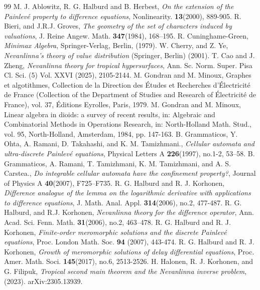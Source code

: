 \documentclass{article}
\begin{document}
\begin{thebibliography}{99}
 M. J. Ablowitz, R. G. Halburd and B. Herbest, \textit{On the extension of the Painlev\'{e} property to difference equations}, Nonlinearity. \textbf{13}(2000), 889-905.
 R. Bieri, and J.R.J. Groves, \textit{The geometry of the set of characters induced by valuations}, J. Reine
Angew. Math. \textbf{347}(1984), 168–195.
 R. Cuninghame-Green, \textit{Minimax Algebra}, Springer-Verlag, Berlin, (1979).
 W. Cherry, and Z. Ye, \textit{Nevanlinna's theory of value distribution} (Springer, Berlin) (2001).
 T. Cao and J. Zheng, \textit{Nevanlinna theory for tropical hypersurfaces}, Ann. Sc. Norm. Super. Pisa Cl. Sci. (5) Vol. XXVI (2025), 2105-2144.
 M. Gondran and M. Minoux, Graphes et algotithmes, Collection de la Direction des \'Etudes et Recherches d'\'Electricit\'e de France (Collection of the Department of Studies and Research of \'Electricit\'e de France), vol. 37, \'Editions Eyrolles, Paris, 1979.
 M. Gondran and M. Minoux, Linear algebra in dioids: a survey of recent results, in: Algebraic and Combinatorial Methods in Operations Research, in: North-Holland Math. Stud., vol. 95, North-Holland, Amsterdam, 1984, pp. 147-163.
 B. Grammaticos, Y. Ohta, A. Ramani, D. Takahashi, and K. M. Tamizhmani., \textit{Cellular automata and ultra-discrete Painlev\'e equations}, Physical Letters A \textbf{226}(1997), no.1-2, 53–58.
 B. Grammaticos, A. Ramani, T. Tamizhmani, K. M. Tamizhmani, and A. S. Carstea., \textit{Do
integrable cellular automata have the confinement property?}, Journal of Physics A \textbf{40}(2007), F725–F735.
 R. G. Halburd and R. J. Korhonen, \textit{Difference analogue of the lemma on the logarithmic derivative with applications to difference equations}, J. Math. Anal. Appl. \textbf{314}(2006), no.2, 477-487.
 R. G. Halburd, and R.J. Korhonen, \textit{Nevanlinna theory for the difference operator}, Ann. Acad. Sci. Fenn. Math. \textbf{31}(2006), no.2, 463–478.
 R. G. Halburd and R. J. Korhonen, \textit{Finite-order meromorphic solutions and the discrete Painlev\'{e} equations}, Proc. London Math. Soc. \textbf{94} (2007), 443-474.
 R. G. Halburd and R. J. Korhonen, \textit{Growth of meromorphic solutions of delay differential equations}, Proc. Amer. Math. Soci. \textbf{145}(2017), no.6, 2513-2526.
 H. Halonen, R. J. Korhonen, and G. Filipuk, \textit{Tropical second main theorem and the Nevanlinna inverse problem}, (2023). arXiv:2305.13939.

\end{thebibliography}
\end{document}
